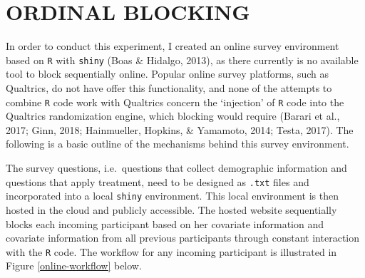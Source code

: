 \documentclass[12pt,econ]{sources/authesis}
\begin{document}
\appendix

\hypertarget{app-ordblock}{%
\chapter{ORDINAL BLOCKING}\label{app-ordblock}}

In order to conduct this experiment, I created an online survey environment based on \texttt{R} with \texttt{shiny} (Boas \& Hidalgo, 2013), as there currently is no available tool to block sequentially online. Popular online survey platforms, such as Qualtrics, do not have offer this functionality, and none of the attempts to combine \texttt{R} code work with Qualtrics concern the `injection' of \texttt{R} code into the Qualtrics randomization engine, which blocking would require (Barari et al., 2017; Ginn, 2018; Hainmueller, Hopkins, \& Yamamoto, 2014; Testa, 2017). The following is a basic outline of the mechanisms behind this survey environment.

The survey questions, i.e.~questions that collect demographic information and questions that apply treatment, need to be designed as \texttt{.txt} files and incorporated into a local \texttt{shiny} environment. This local environment is then hosted in the cloud and publicly accessible. The hosted website sequentially blocks each incoming participant based on her covariate information and covariate information from all previous participants through constant interaction with the \texttt{R} code. The workflow for any incoming participant is illustrated in Figure \ref{online-workflow} below.
\end{document}
